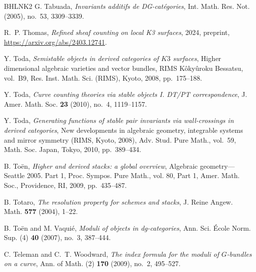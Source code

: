 \documentclass[12pt]{amsart}
\theoremstyle{definition}
\newcommand{\1}{\mathbf 1}
\begin{document}
\begin{thebibliography}{BHLNK2}
G. Tabuada, \emph{Invariants additifs de {DG}-cat\'egories}, Int. Math. Res. Not. (2005), no.~53, 3309--3339.

R.~P. Thomas, \emph{Refined sheaf counting on local K3 surfaces}, 2024, preprint, \url{https://arxiv.org/abs/2403.12741}.

Y. Toda, \emph{Semistable objects in derived categories of {$K3$} surfaces}, Higher dimensional algebraic varieties and vector bundles, RIMS K\^oky\^uroku Bessatsu, vol.~B9, Res. Inst. Math. Sci. (RIMS), Kyoto, 2008, pp.~175--188.

Y. Toda, \emph{Curve counting theories via stable objects {I}. {DT}/{PT} correspondence}, J. Amer. Math. Soc. \textbf{23} (2010), no.~4, 1119--1157.

Y. Toda, \emph{Generating functions of stable pair invariants via wall-crossings in derived categories}, New developments in algebraic geometry, integrable systems and mirror symmetry ({RIMS}, {K}yoto, 2008), Adv. Stud. Pure Math., vol.~59, Math. Soc. Japan, Tokyo, 2010, pp.~389--434.

B. To{\"e}n, \emph{Higher and derived stacks: a global overview}, Algebraic geometry---{S}eattle 2005. {P}art 1, Proc. Sympos. Pure Math., vol. 80, Part 1, Amer. Math. Soc., Providence, RI, 2009, pp.~435--487.

B. Totaro, \emph{The resolution property for schemes and stacks}, J. Reine Angew. Math. \textbf{577} (2004), 1--22.

B. To\"{e}n and M. Vaqui\'{e}, \emph{Moduli of objects in dg-categories}, Ann. Sci. \'{E}cole Norm. Sup. (4) \textbf{40} (2007), no.~3, 387--444.

C. Teleman and C.~T. Woodward, \emph{The index formula for the moduli of {$G$}-bundles on a curve}, Ann. of Math. (2) \textbf{170} (2009), no.~2, 495--527.

\end{thebibliography}
\end{document}
